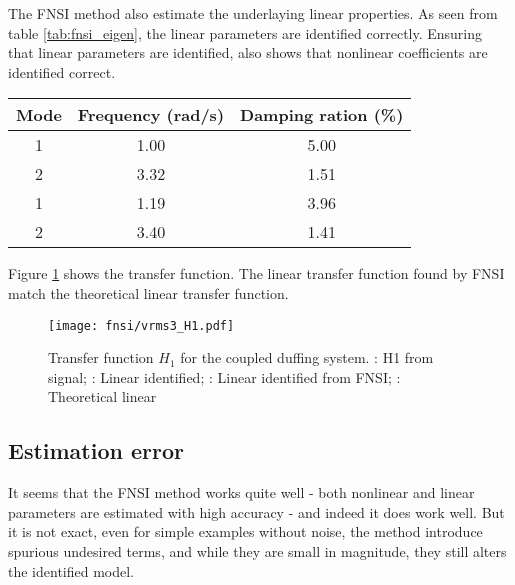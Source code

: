 The FNSI method also estimate the underlaying linear properties. As seen from
table \ref{tab:fnsi_eigen}, the linear parameters are identified correctly.
Ensuring that linear parameters are identified, also shows that nonlinear
coefficients are identified correct.

\begin{center}
  \begin{tabular}{*{3}{c}}
    \hline
    Mode & Frequency (rad/s) & Damping ration (\%) \\
    \hline
    1 & 1.00 & 5.00 \\
    2 & 3.32 & 1.51 \\
    \hline
    1 & 1.19 & 3.96 \\
    2 & 3.40 & 1.41 \\
    \hline
  \end{tabular}
  \label{tab:fnsi_eigen}
\end{center}

Figure \ref{fig:fnsi_H1} shows the transfer function. The linear transfer
function found by FNSI match the theoretical linear transfer function.

\begin{figure}[!ht]
  \centering
  \texttt{[image: fnsi/vrms3\_H1.pdf]}
  \caption{Transfer function $H_1$ for the coupled duffing system.
    \sampleline{}: H1 from signal;
    \textcolor{red}{}: Linear identified;
    \textcolor{orange}{}: Linear identified from FNSI;
    \textcolor{blue}{}: Theoretical linear
  }
  \label{fig:fnsi_H1}
\end{figure}

\subsection{Estimation error}
\label{sec:fnsi-estimation-error}

It seems that the FNSI method works quite well - both nonlinear and linear
parameters are estimated with high accuracy - and indeed it does work well. But
it is not exact, even for simple examples without noise, the method introduce
spurious undesired terms, and while they are small in magnitude, they still
alters the identified model.

